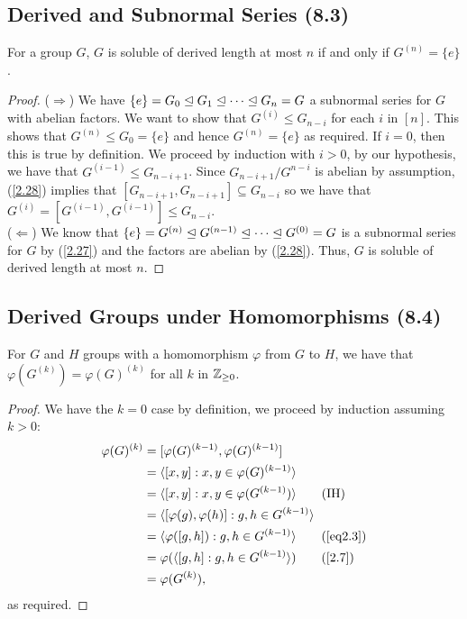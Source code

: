 \subsection{Derived and Subnormal Series (8.3)} \label{8.3}

For a group $G$, $G$ is soluble of derived length at most $n$ if
and only if $G^{(n)} = \{e\}$.

\begin{proof}
    ($\Longrightarrow$) We have
    $\{e\} = G_0 \trianglelefteq G_1 \trianglelefteq \cdots \trianglelefteq G_n = G$ a
    subnormal series for $G$ with abelian factors. We want to
    show that $G^{(i)} \leq G_{n - i}$ for each $i$ in $[n]$.
    This shows that $G^{(n)} \leq G_0 = \{e\}$ and hence 
    $G^{(n)} = \{e\}$ as required. If $i = 0$, then this is
    true by definition. We proceed by induction with $i > 0$,
    by our hypothesis, we have that $G^{(i - 1)} \leq G_{n - i + 1}$.
    Since $G_{n - i + 1}/G^{n - i}$ is abelian by assumption, (\ref{2.28})
    implies that $[G_{n - i + 1}, G_{n - i + 1}] \subseteq G_{n - i}$
    so we have that
    $G^{(i)} = [G^{(i - 1)}, G^{(i - 1)}] \leq G_{n - i}$.
    \\[\baselineskip]
    ($\Longleftarrow$) We know that 
    $\{e\} = G^{(n)} \trianglelefteq G^{(n - 1)} \trianglelefteq \cdots \trianglelefteq G^{(0)} = G$
    is a subnormal series for $G$ by (\ref{2.27}) and the factors
    are abelian by (\ref{2.28}). Thus, $G$ is soluble of derived length
    at most $n$.
\end{proof}

\subsection{Derived Groups under Homomorphisms (8.4)} \label{8.4}

For $G$ and $H$ groups with a homomorphism $\varphi$ from $G$ to $H$,
we have that $\varphi(G^{(k)}) = \varphi(G)^{(k)}$ for all $k$ in
$\mathbb{Z}_{\geq 0}$. 

\begin{proof}
    We have the $k = 0$ case by definition, we proceed by induction
    assuming $k > 0$: \begin{align*}
        \varphi(G)^{(k)} 
        &= [\varphi(G)^{(k - 1)}, \varphi(G)^{(k - 1)}] \\
        &= \ang{[x, y] : x, y \in \varphi(G)^{(k - 1)}} \\
        &= \ang{[x, y] : x, y \in \varphi(G^{(k - 1)})} \tag{IH} \\
        &= \ang{[\varphi(g), \varphi(h)] : g, h \in G^{(k - 1)}} \\
        &= \ang{\varphi([g, h]) : g, h \in G^{(k - 1)}} \tag{\ref{eq2.3}} \\
        &= \varphi(\ang{[g, h] : g, h \in G^{(k - 1)}}) \tag{\ref{2.7}} \\
        &= \varphi(G^{(k)}),
    \end{align*} as required.
\end{proof}

